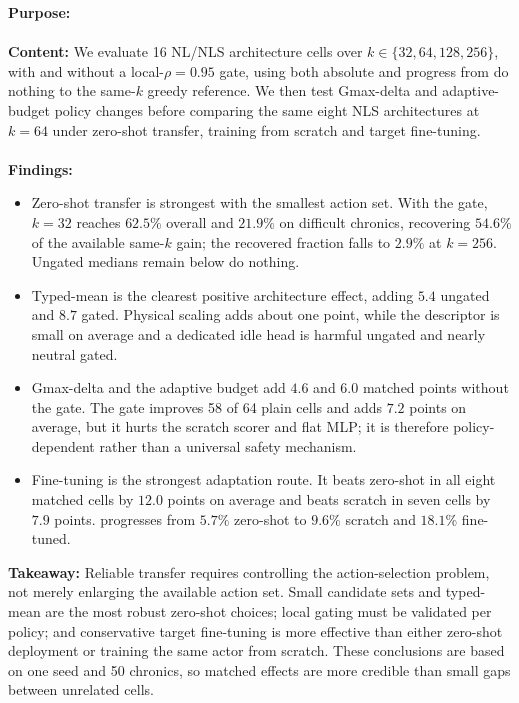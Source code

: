 \begin{tcolorbox}[
  colframe=red!75!black,
  colback=red!5!white,
  title=Chapter 10 Summary: Complete-Policy Transfer and Adaptation]
\textbf{Purpose:} 
\\
\\
\textbf{Content:}  We evaluate 16 NL/NLS architecture cells over
$k\in\{32,64,128,256\}$, with and without a local-$\rho=0.95$ gate, using both
absolute  and progress from do nothing to the same-$k$ greedy reference.
We then test Gmax-delta and adaptive-budget policy changes before comparing the
same eight NLS architectures at $k=64$ under zero-shot transfer, training from
scratch and target fine-tuning.
\\
\\
\textbf{Findings:}
\begin{itemize}
  \item Zero-shot transfer is strongest with the smallest action set. With the
  gate, $k=32$ reaches $62.5\%$ overall and $21.9\%$ on difficult chronics,
  recovering $54.6\%$ of the available same-$k$ gain; the recovered fraction
  falls to $2.9\%$ at $k=256$. Ungated medians remain below do nothing.
  \item Typed-mean  is the clearest positive architecture effect,
  adding $5.4$  ungated and $8.7$ gated. Physical
  scaling adds about one point, while the descriptor is small on average and a
  dedicated idle head is harmful ungated and nearly neutral gated.
  \item Gmax-delta and the adaptive budget add $4.6$ and $6.0$ matched points
  without the gate. The gate improves 58 of 64 plain cells and adds $7.2$ points
  on average, but it hurts the scratch scorer and flat MLP; it is therefore
  policy-dependent rather than a universal safety mechanism.
  \item Fine-tuning is the strongest adaptation route. It beats zero-shot in
  all eight matched cells by $12.0$ points on average and beats scratch in seven
  cells by $7.9$ points.  progresses from
  $5.7\%$ zero-shot to $9.6\%$ scratch and $18.1\%$ fine-tuned.
\end{itemize}
\textbf{Takeaway:} Reliable transfer requires controlling the action-selection
problem, not merely enlarging the available action set. Small candidate sets
and typed-mean  are the most robust zero-shot choices; local gating must
be validated per policy; and conservative target fine-tuning is more effective
than either zero-shot deployment or training the same actor from scratch. These
conclusions are based on one seed and 50 chronics, so matched effects are more
credible than small gaps between unrelated cells.
\end{tcolorbox}
